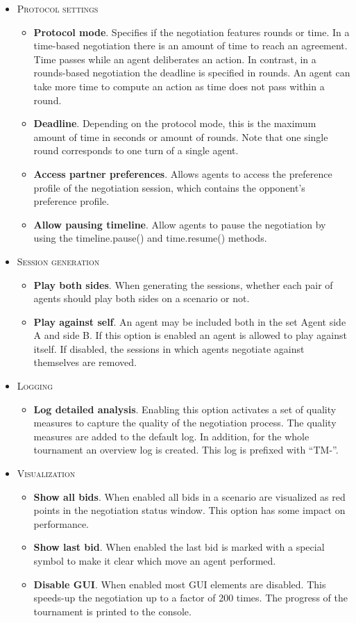\documentclass[]{article}
\begin{document}
\begin{itemize}
	\item \textsc{Protocol settings}
	\begin{itemize}
		\item \textbf{Protocol mode}. Specifies if the negotiation features rounds or time. In a time-based negotiation there is an amount of time to reach an agreement. Time passes while an agent deliberates an action. In contrast, in a rounds-based negotiation the deadline is specified in rounds. An agent can take more time to compute an action as time does not pass within a round.
		\item \textbf{Deadline}. Depending on the protocol mode, this is the maximum amount of time in seconds or amount of rounds. Note that one single round corresponds to one turn of a single agent.
		\item \textbf{Access partner preferences}. Allows agents to access the preference profile of the negotiation session, which contains the opponent's preference profile.
		\item \textbf{Allow pausing timeline}. Allow agents to pause the negotiation by using the timeline.pause() and time.resume() methods.
	\end{itemize}
	\item \textsc{Session generation}
	\begin{itemize}
		\item \textbf{Play both sides}. When generating the sessions, whether each pair of agents should play both sides on a scenario or not.
		\item \textbf{Play against self}. An agent may be included both in the set Agent side A and side B. If this option is enabled an agent is allowed to play against itself. If disabled, the sessions in which agents negotiate against themselves are removed.
	\end{itemize}
	\item \textsc{Logging}
	\begin{itemize}
		\item \textbf{Log detailed analysis}. Enabling this option activates a set of quality measures to capture the quality of the negotiation process. The quality measures are added to the default log. In addition, for the whole tournament an overview log is created. This log is prefixed with ``TM-''.
	\end{itemize}
	\item \textsc{Visualization}
	\begin{itemize}
		\item \textbf{Show all bids}. When enabled all bids in a scenario are visualized as red points in the negotiation status window. This option has some impact on performance.
		\item \textbf{Show last bid}. When enabled the last bid is marked with a special symbol to make it clear which move an agent performed.
		\item \textbf{Disable GUI}. When enabled most GUI elements are disabled. This speeds-up the negotiation up to a factor of 200 times. The progress of the tournament is printed to the console.
	\end{itemize}
\end{itemize}
\end{document}
